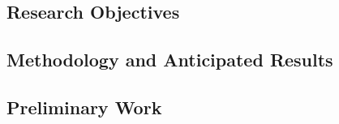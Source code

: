 \subsection{Research Objectives}


\subsection{Methodology and Anticipated Results}


\subsection{Preliminary Work}





